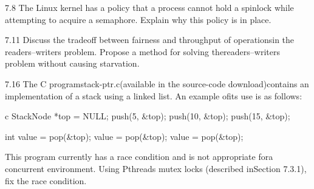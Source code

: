 \documentclass[12pt,a4paper]{article}
\newenvironment{problems}{\begin{list}{}{\renewcommand{\makelabel}[1]{\textbf{##1}\hfil}}}{\end{list}}
\begin{document}
\begin{problems}
    \item[7.8] The Linux kernel has a policy that a process cannot hold a spinlock while attempting to acquire a semaphore. Explain why this policy is in place.
    \item[7.11] Discuss the tradeoff between fairness and throughput of operationsin the readers–writers problem. Propose a method for solving thereaders–writers problem without causing starvation.
    \item[7.16] The C programstack-ptr.c(available in the source-code download)contains an implementation of a stack using a linked list. An example ofits use is as follows:
    \begin{code}{c}
        StackNode *top = NULL;
        push(5, &top);
        push(10, &top);
        push(15, &top);
        
        int value = pop(&top);
        value = pop(&top);
        value = pop(&top);
    \end{code} 
    This program currently has a race condition and is not appropriate fora concurrent environment. Using Pthreads mutex locks (described inSection 7.3.1), fix the race condition.
\end{problems}
\end{document}

